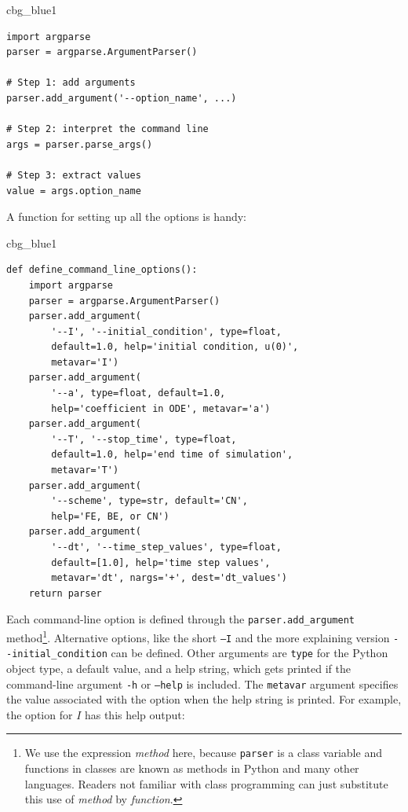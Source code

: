 \documentclass[%
oneside,                 %
final,                   %
10pt]{article}
\newenvironment{_cod_tight}[1]{
   \def\FrameCommand{\colorbox{#1}}
   \FrameRule0.6pt\MakeFramed {\FrameRestore}\vskip3mm}
   {\vskip0mm\endMakeFramed}
\newenvironment{cod}[1]{
\bgroup\rmfamily
\fboxsep=0mm\relax
\begin{_cod_tight}{#1}
\list{}{\parsep=-2mm\parskip=0mm\topsep=0pt\leftmargin=2mm
\rightmargin=2\leftmargin\leftmargin=4pt\relax}
\item\relax}
{\endlist\end{_cod_tight}\egroup}
\begin{document}
\begin{cod}{cbg_blue1}\begin{Verbatim}[numbers=none,fontsize=\fontsize{9pt}{9pt},baselinestretch=0.95,xleftmargin=2mm]
import argparse
parser = argparse.ArgumentParser()

# Step 1: add arguments
parser.add_argument('--option_name', ...)

# Step 2: interpret the command line
args = parser.parse_args()

# Step 3: extract values
value = args.option_name
\end{Verbatim}
\end{cod}
\noindent

A function for setting up all the options is handy:

\begin{cod}{cbg_blue1}\begin{Verbatim}[numbers=none,fontsize=\fontsize{9pt}{9pt},baselinestretch=0.95,xleftmargin=2mm]
def define_command_line_options():
    import argparse
    parser = argparse.ArgumentParser()
    parser.add_argument(
        '--I', '--initial_condition', type=float,
        default=1.0, help='initial condition, u(0)',
        metavar='I')
    parser.add_argument(
        '--a', type=float, default=1.0,
        help='coefficient in ODE', metavar='a')
    parser.add_argument(
        '--T', '--stop_time', type=float,
        default=1.0, help='end time of simulation',
        metavar='T')
    parser.add_argument(
        '--scheme', type=str, default='CN',
        help='FE, BE, or CN')
    parser.add_argument(
        '--dt', '--time_step_values', type=float,
        default=[1.0], help='time step values',
        metavar='dt', nargs='+', dest='dt_values')
    return parser
\end{Verbatim}
\end{cod}
\noindent

Each command-line option is defined through the \Verb!parser.add_argument!
method\footnote{We use the expression \emph{method} here, because \texttt{parser} is a class variable and functions in classes are known as methods in Python and many other languages. Readers not familiar with class programming can just substitute this use of \emph{method} by \emph{function}.}. Alternative options, like the short \texttt{--I} and the more
explaining version \Verb!--initial_condition! can be defined. Other arguments
are \texttt{type} for the Python object type, a default value, and a help
string, which gets printed if the command-line argument \texttt{-h} or \texttt{--help} is
included. The \texttt{metavar} argument specifies the value associated with
the option when the help string is printed. For example, the option for
$I$ has this help output:
\end{document}
